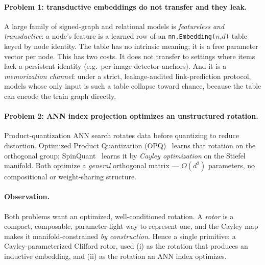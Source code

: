 \documentclass[11pt]{article}
\begin{document}
\paragraph{Problem 1: transductive embeddings do not transfer and they leak.}
A large family of signed-graph and relational models is \emph{featureless and
transductive}: a node's feature is a learned row of an \texttt{nn.Embedding(}$n$,$d$\texttt{)}
table keyed by node identity. The table has no intrinsic meaning; it is a free
parameter vector per node. This has two costs. It does not transfer to settings
where items lack a persistent identity (e.g.\ per-image detector anchors). And it
is a \emph{memorization channel}: under a strict, leakage-audited link-prediction
protocol, models whose only input is such a table collapse toward chance, because
the table can encode the train graph directly.

\paragraph{Problem 2: ANN index projection optimizes an unstructured rotation.}
Product-quantization ANN search rotates data before quantizing to reduce
distortion. Optimized Product Quantization (OPQ)~\cite{ge2013opq} learns that
rotation on the orthogonal group; SpinQuant~\cite{liu2024spinquant} learns it by
\emph{Cayley optimization} on the Stiefel manifold. Both optimize a \emph{general}
orthogonal matrix --- $O(d^2)$ parameters, no compositional or weight-sharing
structure.

\paragraph{Observation.} Both problems want an optimized, well-conditioned
rotation. A \emph{rotor} is a compact, composable, parameter-light way to
represent one, and the Cayley map makes it manifold-constrained \emph{by
construction}. Hence a single primitive: a Cayley-parameterized Clifford rotor,
used (i) as the rotation that produces an inductive embedding, and (ii) as the
rotation an ANN index optimizes.
\end{document}
